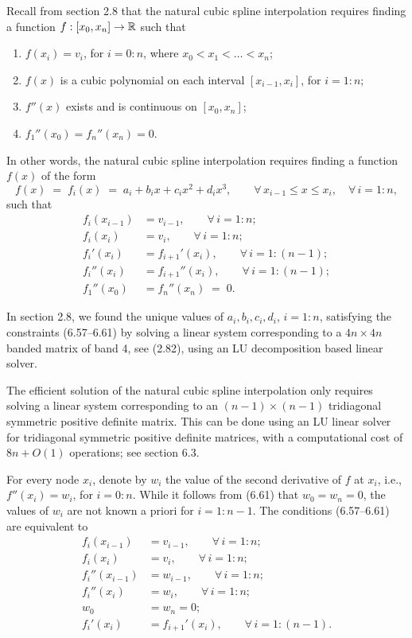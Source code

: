 Recall from section 2.8 that the natural cubic spline interpolation requires finding a
function $f : [x_0,x_n] \to \mathbb{R}$ such that
\begin{enumerate}[label=(\roman*)]
\item $f(x_i) = v_i$, for $i = 0:n$, where $x_0 < x_1 < \ldots < x_n$;
\item $f(x)$ is a cubic polynomial on each interval $[x_{i-1},x_i]$, for $i = 1:n$;
\item $f''(x)$ exists and is continuous on $[x_0,x_n]$;
\item $f_1''(x_0) = f_n''(x_n) = 0$.
\end{enumerate}

In other words, the natural cubic spline interpolation requires finding a function
$f(x)$ of the form
\begin{equation}
f(x) \;=\; f_i(x) \;=\; a_i + b_ix + c_ix^2 + d_ix^3, \qquad \forall\, x_{i-1} \le x \le
x_i, \quad \forall\, i = 1:n,
\end{equation}
such that
\begin{align}
f_i(x_{i-1}) &= v_{i-1}, \qquad \forall\, i = 1:n; \\
f_i(x_i) &= v_i, \qquad \forall\, i = 1:n; \\
f_i'(x_i) &= f_{i+1}'(x_i), \qquad \forall\, i = 1:(n-1); \\
f_i''(x_i) &= f_{i+1}''(x_i), \qquad \forall\, i = 1:(n-1); \\
f_1''(x_0) &= f_n''(x_n) \;=\; 0.
\end{align}

In section 2.8, we found the unique values of $a_i, b_i, c_i, d_i$, $i = 1:n$,
satisfying the constraints (6.57--6.61) by solving a linear system corresponding to a
$4n \times 4n$ banded matrix of band 4, see (2.82), using an LU decomposition based
linear solver.

The efficient solution of the natural cubic spline interpolation only requires solving
a linear system corresponding to an $(n-1) \times (n-1)$ tridiagonal symmetric
positive definite matrix. This can be done using an LU linear solver for tridiagonal
symmetric positive definite matrices, with a computational cost of $8n + O(1)$
operations; see section 6.3.

For every node $x_i$, denote by $w_i$ the value of the second derivative of $f$ at
$x_i$, i.e., $f''(x_i) = w_i$, for $i = 0:n$. While it follows from (6.61) that $w_0 =
w_n = 0$, the values of $w_i$ are not known a priori for $i = 1:n-1$. The conditions
(6.57--6.61) are equivalent to
\begin{align}
f_i(x_{i-1}) &= v_{i-1}, \qquad \forall\, i = 1:n; \\
f_i(x_i) &= v_i, \qquad \forall\, i = 1:n; \\
f_i''(x_{i-1}) &= w_{i-1}, \qquad \forall\, i = 1:n; \\
f_i''(x_i) &= w_i, \qquad \forall\, i = 1:n; \\
w_0 &= w_n = 0; \\
f_i'(x_i) &= f_{i+1}'(x_i), \qquad \forall\, i = 1:(n-1).
\end{align}

